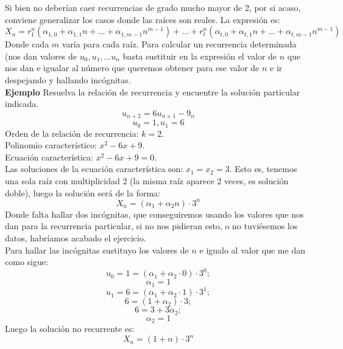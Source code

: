 \documentclass[a4paper]{article}
\begin{document}
Si bien no deberían caer recurrencias de grado mucho mayor de 2, por si acaso, conviene generalizar los casos donde las raíces son reales. La expresión es:
$$X_n=r_1^n(\alpha_{1,0}+\alpha_{1,1}n+...+\alpha_{1,m-1}n^{m-1})+...+r_t^n(\alpha_{t,0}+\alpha_{t,1}n+...+\alpha_{t,m-1}n^{m-1})$$
Donde cada $m$ varía para cada raíz.
Para calcular un recurrencia determinada (nos dan valores de $u_0, u_1,\dots u_n$ basta sustituir en la expresión el valor de $n$ que nos dan e igualar al número que queremos obtener para ese valor de $n$ e ir despejando y hallando incógnitas.\\

\large{\textbf{Ejemplo}}
Resuelva la relación de recurrencia y encuentre la solución particular indicada.
$$u_{n+2}=6u_{n+1}-9_n$$
$$u_0=1, u_1=6$$
Orden de la relación de recurrencia: $k=2$.\\
Polinomio característico: $x^2-6x+9$.\\
Ecuación característica: $x^2-6x+9=0$.\\
Las soluciones de la ecuación característica son: $x_1=x_2=3$. Esto es, tenemos una sola raíz con multiplicidad 2 (la misma raíz aparece 2 veces, es solución doble), luego la solución será de la forma:
$$X_n=(\alpha_1+\alpha_2n)\cdot 3^n$$
Donde falta hallar dos incógnitas, que conseguiremos usando los valores que nos dan para la recurrencia particular, si no nos pidieran esto, o no tuviésemos los datos, habríamos acabado el ejercicio.\\
Para hallar las incógnitas sustituyo los valores de $n$ e igualo al valor que me dan como sigue:
$$u_0=1=(\alpha_1+\alpha_2\cdot 0)\cdot 3^0;$$
$$\alpha_1=1$$
$$u_1=6=(\alpha_1+\alpha_2\cdot 1)\cdot 3^1;$$
$$6=(1+\alpha_2)\cdot 3;$$
$$6=3+3\alpha_2;$$
$$\alpha_2=1$$
Luego la solución no recurrente es:
$$X_n=(1+n)\cdot 3^n$$
\end{document}
